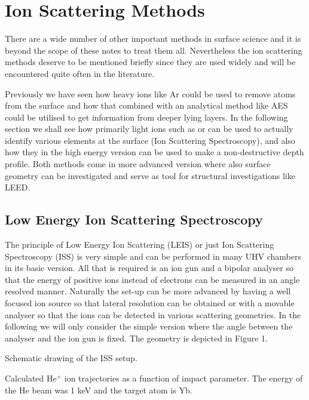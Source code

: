 \newpage
\chapter{Ion Scattering Methods}
There are a wide number of other important methods in surface science and it is beyond the scope of these notes to treat them all. Nevertheless the ion scattering methods deserve to be mentioned briefly since they are used widely and will be encountered quite often in the literature.

Previously we have seen how heavy ions like Ar could be used to remove atoms from the surface and how that combined with an analytical method like AES could be utilised to get information from deeper lying layers. In the following section we shall see how primarily light ions such as  or  can be used to actually identify various elements at the surface (Ion Scattering Spectroscopy), and also how they in the high energy version can be used to make a non-destructive depth profile. Both methods come in more advanced version where also surface geometry can be investigated and serve as tool for structural investigations like LEED.

\section{Low Energy Ion Scattering Spectroscopy}
The principle of Low Energy Ion Scattering (LEIS) or just Ion Scattering Spectroscopy (ISS) is very simple and can be performed in many UHV chambers in its basic version. All that is required is an ion gun and a bipolar analyser so that the energy of positive ions instead of electrons can be measured in an angle resolved manner. Naturally the set-up can be more advanced by having a well focused ion source so that lateral resolution can be obtained or with a movable analyser so that the ions can be detected in various scattering geometries. In the following we will only consider the simple version where the angle between the analyser and the ion gun is fixed. The geometry is depicted in Figure 1. 

\vspace*{8cm}

 Schematic drawing of the ISS setup.

\vspace{1cm}

\vspace*{8cm}

 Calculated He$^+$ ion trajectories as a function of impact parameter. The energy of the He beam was 1 keV and the target atom is Yb.

